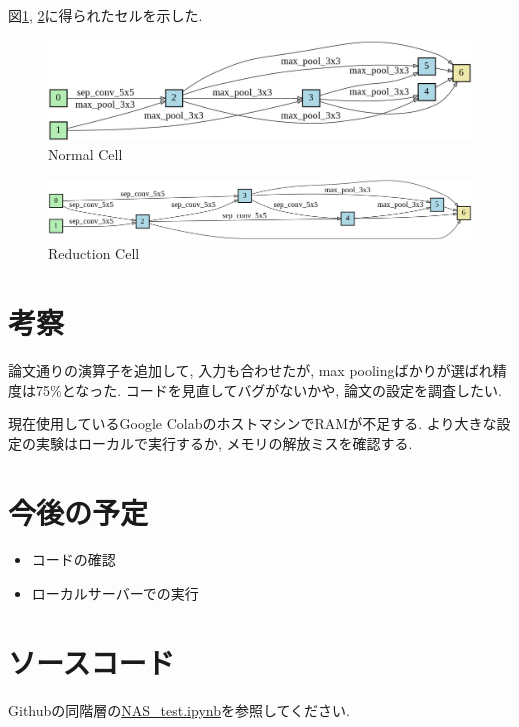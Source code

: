 \documentclass[twocolumn]{jarticle}     %
\begin{document}
図\ref{fig:cell}, \ref{fig:cell2}に得られたセルを示した.

\begin{figure}[t]
	\begin{center}
		\includegraphics[clip,width=14.5cm]{epoch45_normal.png}
		\caption{Normal Cell}
		\label{fig:cell}
	\end{center}
\end{figure}

\begin{figure}[t]
	\begin{center}
		\includegraphics[clip,width=16.5cm]{epoch45_reduce.png}
		\caption{Reduction Cell}
		\label{fig:cell2}
	\end{center}
\end{figure}

\section{考察}
論文通りの演算子を追加して, 入力も合わせたが, max poolingばかりが選ばれ精度は75\%となった.
コードを見直してバグがないかや, 論文の設定を調査したい.

現在使用しているGoogle ColabのホストマシンでRAMが不足する.
より大きな設定の実験はローカルで実行するか, メモリの解放ミスを確認する.

\section{今後の予定}
\begin{itemize}
  \item コードの確認
  \item ローカルサーバーでの実行
\end{itemize}

\section{ソースコード}
Githubの同階層の\url{NAS_test.ipynb}を参照してください.



\end{document}
